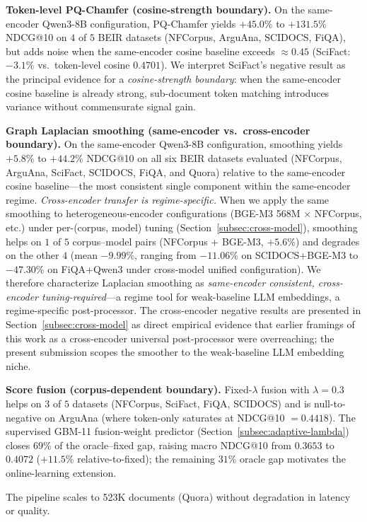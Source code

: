 \documentclass[review,1p]{elsarticle}
\begin{document}
\textbf{Token-level PQ-Chamfer (cosine-strength boundary).} On the same-encoder Qwen3-8B configuration, PQ-Chamfer yields $+45.0\%$ to $+131.5\%$ NDCG@10 on $4$ of $5$ BEIR datasets (NFCorpus, ArguAna, SCIDOCS, FiQA), but adds noise when the same-encoder cosine baseline exceeds $\approx 0.45$ (SciFact: $-3.1\%$ vs.\ token-level cosine $0.4701$). We interpret SciFact's negative result as the principal evidence for a \emph{cosine-strength boundary}: when the same-encoder cosine baseline is already strong, sub-document token matching introduces variance without commensurate signal gain.

\textbf{Graph Laplacian smoothing (same-encoder vs.\ cross-encoder boundary).} On the same-encoder Qwen3-8B configuration, smoothing yields $+5.8\%$ to $+44.2\%$ NDCG@10 on all six BEIR datasets evaluated (NFCorpus, ArguAna, SciFact, SCIDOCS, FiQA, and Quora) relative to the same-encoder cosine baseline---the most consistent single component within the same-encoder regime. \emph{Cross-encoder transfer is regime-specific.} When we apply the same smoothing to heterogeneous-encoder configurations (BGE-M3 568M $\times$ NFCorpus, etc.) under per-(corpus, model) tuning (Section~\ref{subsec:cross-model}), smoothing helps on $1$ of $5$ corpus--model pairs (NFCorpus + BGE-M3, $+5.6\%$) and degrades on the other $4$ (mean $-9.99\%$, ranging from $-11.06\%$ on SCIDOCS+BGE-M3 to $-47.30\%$ on FiQA+Qwen3 under cross-model unified configuration). We therefore characterize Laplacian smoothing as \emph{same-encoder consistent, cross-encoder tuning-required}---a regime tool for weak-baseline LLM embeddings, a regime-specific post-processor. The cross-encoder negative results are presented in Section~\ref{subsec:cross-model} as direct empirical evidence that earlier framings of this work as a cross-encoder universal post-processor were overreaching; the present submission scopes the smoother to the weak-baseline LLM embedding niche.

\textbf{Score fusion (corpus-dependent boundary).} Fixed-$\lambda$ fusion with $\lambda=0.3$ helps on $3$ of $5$ datasets (NFCorpus, SciFact, FiQA, SCIDOCS) and is null-to-negative on ArguAna (where token-only saturates at NDCG@10 $=0.4418$). The supervised GBM-11 fusion-weight predictor (Section~\ref{subsec:adaptive-lambda}) closes $69\%$ of the oracle--fixed gap, raising macro NDCG@10 from $0.3653$ to $0.4072$ ($+11.5\%$ relative-to-fixed); the remaining $31\%$ oracle gap motivates the online-learning extension.

The pipeline scales to 523K documents (Quora) without degradation in latency or quality.
\end{document}
